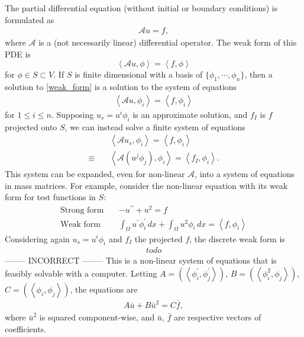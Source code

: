 \documentclass{article}
\newcommand{\pr}{\prime}
\newcommand{\ppr}{{\prime\prime}}
\newcommand{\inner}[1]{\left<#1\right>}
\newcommand{\fancyA}{\mathcal{A}}
\begin{document}
The partial differential equation (without initial or boundary conditions) is formulated as
\begin{align*}
    \fancyA u = f,
\end{align*}
where $\fancyA$ is a (not necessarily linear) differential operator.
The weak form of this PDE is
\begin{equation}\label{weak_form}
    \inner{\fancyA u, \phi} = \inner{f, \phi}
\end{equation}
for $\phi \in S \subset V$. If $S$ is finite dimensional with a basis of $\{\phi_1,\cdots,\phi_n\}$,
then a solution to \eqref{weak_form} is a solution to the system of equations
\begin{align*}
    \inner{\fancyA u, \phi_i} = \inner{f, \phi_i}
\end{align*}
for $1 \leq i \leq n$. Supposing $u_s = u^i \phi_i$ is an approximate solution, and $f_I$ is $f$ projected onto $S$, we can instead solve a finite system of equations
\begin{align*}
    & \inner{\fancyA u_s, \phi_i} = \inner{f, \phi_i} \\
    \equiv\quad& \inner{\fancyA(u^j \phi_j), \phi_i} = \inner{f_I, \phi_i}.
\end{align*}
This system can be expanded, even for non-linear $\fancyA$, into a system of equations in mass matrices.
For example, consider the non-linear equation with its weak form for test functions in $S$:
\begin{align*}
    \text{Strong form}\quad& -u^\ppr + u^2 = f \\
    \text{Weak form}\quad& \int_\Omega u^\pr \phi_i^\pr\, dx + \int_\Omega u^2 \phi_i\, dx = \inner{f, \phi_i}
\end{align*}
Considering again $u_s = u^i \phi_i$ and $f_I$ the projected $f$, the discrete weak form is
\begin{align*}
    todo
\end{align*}
--------
INCORRECT
--------
This is a non-linear system of equations that is feasibly solvable with a computer.
Letting $A = \left(\inner{\phi^\pr_i, \phi^\pr_j}\right)$, $B = \left(\inner{\phi_i^2, \phi_j}\right)$, $C = \left(\inner{\phi_i, \phi_j}\right)$, the equations are
\begin{align*}
    A\bar{u} + B\bar{u}^2 = C\bar{f},
\end{align*}
where $\bar{u}^2$ is squared component-wise, and $\bar{u}$, $\bar{f}$ are respective vectors of coefficients.
\end{document}
